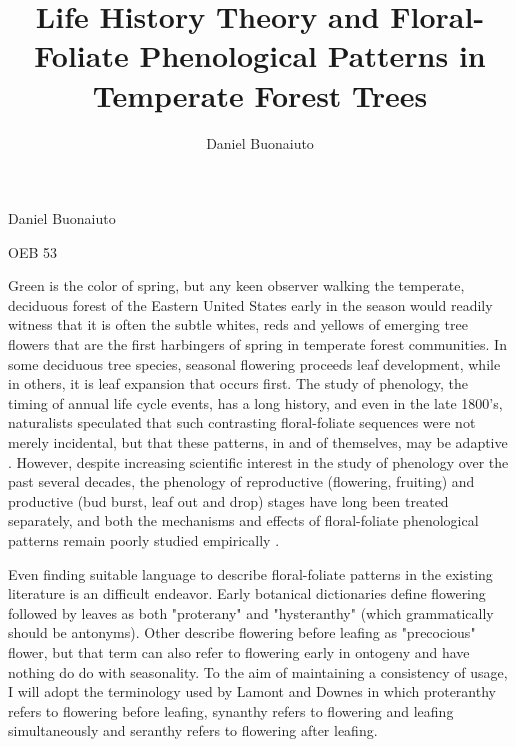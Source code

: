 \documentclass{article}\usepackage[]{graphicx}\usepackage[]{color}
\begin{document}
\title{Life History Theory and Floral-Foliate Phenological Patterns in Temperate Forest Trees}
\author{Daniel Buonaiuto}
Daniel Buonaiuto
\par OEB 53
\par\data{\today}

Green is the color of spring, but any keen observer walking the temperate, deciduous forest of the Eastern United States early in the season would readily witness that it is often the subtle whites, reds and yellows of emerging tree flowers that are the first harbingers of spring in temperate forest communities. In some deciduous tree species, seasonal flowering proceeds leaf development, while in others, it is leaf expansion that occurs first. The study of phenology, the timing of annual life cycle events, has a long history, and even in the late 1800's, naturalists speculated that such contrasting floral-foliate sequences were not merely incidental, but that these patterns, in and of themselves, may be adaptive \citep{Robertson1885}. However, despite increasing scientific interest in the study of phenology over the past several decades, the phenology of reproductive (flowering, fruiting) and productive (bud burst, leaf out and drop) stages have long been treated separately, and both the mechanisms and effects of floral-foliate phenological patterns remain poorly studied empirically \citep{Wolkovich2014}.
\par Even finding suitable language to describe floral-foliate patterns in the existing literature is an difficult endeavor. Early botanical dictionaries define flowering followed by leaves as both "proterany" and "hysteranthy" (which grammatically should be antonyms). Other describe flowering before leafing as "precocious" flower, but that term can also refer to flowering early in ontogeny and have nothing do do with seasonality. To the aim of maintaining a consistency of usage, I will adopt the terminology used by Lamont and Downes \citeyear{Lamont2011} in which proteranthy refers to flowering before leafing, synanthy refers to flowering and leafing simultaneously and seranthy refers to flowering after leafing.
\end{document}
